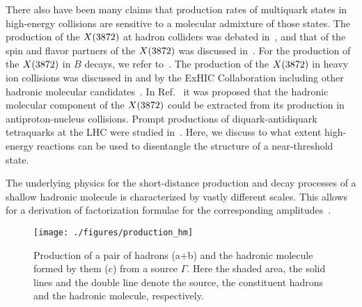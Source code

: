 There also have been many claims that production rates of multiquark states
in high-energy collisions are sensitive to a molecular admixture of those
states.
The production of the $X(3872)$ at hadron colliders was debated
in~\cite{Bignamini:2009sk,Artoisenet:2009wk,Bignamini:2009fn,Artoisenet:2010uu,
Butenschoen:2013pxa,Esposito:2013ada,Meng:2013gga}, and that
of the spin and flavor partners of the $X(3872)$ was discussed
in~\cite{Bignamini:2009fn,Guo:2013ufa,Guo:2014sca}. For the production of the
$X(3872)$ in $B$ decays, we refer
to~\cite{Braaten:2004ai,Braaten:2004fk,Meng:2005er,Fan:2011aa,Meng:2013gga}.
The production of the $X(3872)$ in heavy ion collisions was discussed in
\cite{Cho:2013rpa,Torres:2014fxa} and by the ExHIC Collaboration including other
hadronic molecular candidates~\cite{Cho:2010db,Cho:2011ew,Cho:2015exb}.
In Ref.~\cite{Larionov:2015nea} it was proposed that the hadronic
molecular component of the $X(3872)$ could be extracted from its production in
antiproton-nucleus collisions. Prompt productions of
diquark-antidiquark tetraquarks at the LHC were studied
in~\cite{Guerrieri:2014gfa}.  Here, we discuss to what extent
 high-energy reactions can be used to
disentangle the structure of a near-threshold state.

The underlying physics for the short-distance production and decay processes of
a shallow hadronic molecule  is characterized by vastly different scales.
This allows for a derivation of
factorization formulae for the corresponding
amplitudes~\cite{Braaten:2004ai,Braaten:2004fk,Braaten:2005jj,Braaten:2006sy}.

\begin{figure}[t]
    \centering
    \texttt{[image: ./figures/production\_hm]}
    \caption{Production of a pair of hadrons (a+b) and the hadronic molecule
formed by them (c) from a source $\Gamma$. Here the shaded area, the solid
lines and the double line denote the source, the constituent hadrons and the
hadronic molecule, respectively.
\label{fig:production}}
\end{figure}

